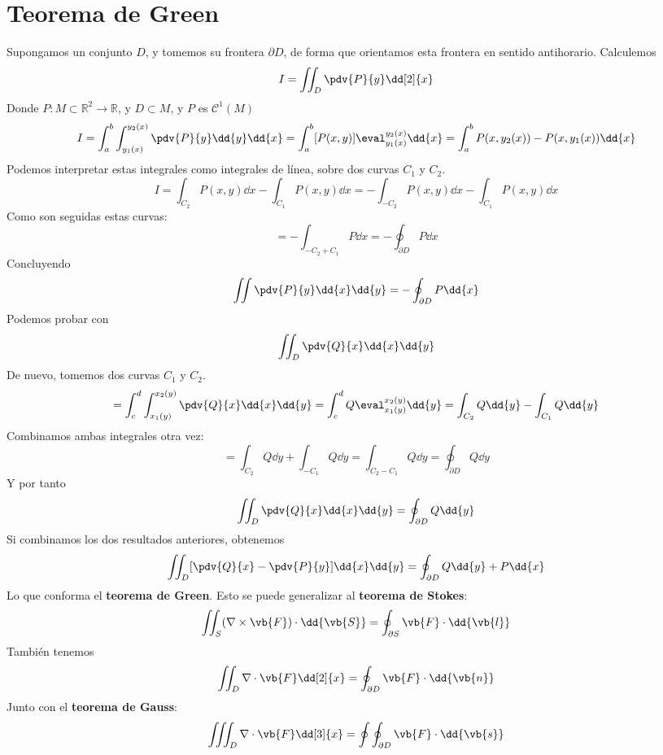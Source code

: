 \documentclass{./Calculo.tex}
\begin{document}
 \section{Teorema de Green}
 Supongamos un conjunto $D$, y tomemos su frontera $\partial D$, de forma que orientamos esta 
 frontera en sentido antihorario. Calculemos
 \[
	 I=\iint_{D} \pdv{P}{y} \dd[2]{x}
 \]
 Donde $P: M \subset \mathbb{R} ^{2} \to \mathbb{R}$, y $D \subset M$, y $P$ es
 $\mathcal{C}^{1}(M)$    
 \[
	 I = \int_{a}^{b}\int_{y_{1}(x)}^{y_{2}(x)} \pdv{P}{y} \dd{y} \dd{x}=
	 \int_{a}^{b}[P(x,y)]\eval_{y_{1}(x)}^{y_{2}(x)}\dd{x}= \int_{a}^{b}P(x,y_{2}(x))-
	 P(x,y_{1}(x))\dd{x}
 \]
 Podemos interpretar estas integrales como integrales de línea, sobre dos curvas $C_{1}$ y
 $C_{2}$.
 \[
 	I = \int_{C_{2}}P(x,y)\dd{x} - \int_{C_{1}} P(x,y)\dd{x} =-\int_{-C_{2}}P(x,y)\dd{x}
	-\int_{C_{1}}P(x,y) \dd{x}
 \]
 Como son seguidas estas curvas:
 \[
 	= -\int_{-C_{2}+C_{1}}P \dd{x} = -\oint_{\partial D} P \dd{x}
 \]
 Concluyendo
 \[
	 \iint \pdv{P}{y} \dd{x} \dd{y} = -\oint_{\partial D} P \dd{x}
 \]
 Podemos probar con
 \[
	 \iint_{D} \pdv{Q}{x} \dd{x} \dd{y}
 \]
 De nuevo, tomemos dos curvas $C_{1}$ y $C_{2}$.  
 \[
	 = \int_{c}^{d} \int_{x_{1}(y)}^{x_{2}(y)} \pdv{Q}{x}\dd{x} \dd{y} =
	 \int_{c}^{d}Q\eval_{x_{1}(y)}^{x_{2}(y)} \dd{y}=
	 \int_{C_{2}}Q \dd{y} - \int_{C_{1}} Q \dd{y}
 \]
 Combinamos ambas integrales otra vez:
 \[
 	= \int_{C_{2}}Q \dd{y} + \int_{-C_{1}}Q \dd{y} = \int_{C_{2}-C_{1}}Q \dd{y} =
	\oint_{\partial D} Q \dd{y}
 \]
 Y por tanto
 \[
	 \iint_{D} \pdv{Q}{x} \dd{x} \dd{y} = \oint_{\partial D} Q \dd{y}
 \]
 Si combinamos los dos resultados anteriores, obtenemos
 \[
	 \iint_{D} [\pdv{Q}{x}-\pdv{P}{y}]\dd{x}\dd{y} = \oint_{\partial D}Q \dd{y} + P \dd{x}
 \]
 Lo que conforma el \textbf{teorema de Green}. Esto se puede generalizar al
 \textbf{teorema de Stokes}:
 \begin{equation}
 	\begin{split}
		\iint_{S}(\nabla \times \vb{F})\cdot \dd{\vb{S}} = \oint_{\partial S} \vb{F} \cdot \dd{\vb{l}}
 	\end{split}
 \end{equation}
 También tenemos
 \begin{equation}
 	\begin{split}
		\iint_{D} \nabla \cdot \vb{F} \dd[2]{x} = \oint_{\partial D} \vb{F} \cdot \dd{\vb{n}}
 	\end{split}
 \end{equation}
 Junto con el \textbf{teorema de Gauss}:
 \begin{equation}
 	\begin{split}
		\iiint_{D} \nabla \cdot \vb{F} \dd[3]{x} = \oint \oint_{\partial D}\vb{F}\cdot \dd{\vb{s}}
 	\end{split}
 \end{equation}
 
\end{document}
